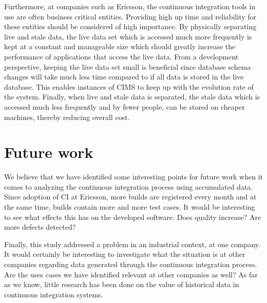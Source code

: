 Furthermore, at companies such as Ericsson, the continuous integration tools in use are often business critical entities. Providing high up time and reliability for these entities should be considered of high importance. By physically separating live and stale data, the live data set which is accessed much more frequently is kept at a constant and manageable size which should greatly increase the performance of applications that access the live data. From a development perspective, keeping the live data set small is beneficial since database schema changes will take much less time compared to if all data is stored in the live database. This enables instances of CIMS to keep up with the evolution rate of the system. Finally, when live and stale data is separated, the stale data which is accessed much less frequently and by fewer people, can be stored on cheaper machines, thereby reducing overall cost.


\section{Future work}
We believe that we have identified some interesting points for future work when it comes to analyzing the continuous integration process using accumulated data. Since adoption of CI at Ericsson, more builds are registered every month and at the same time, builds contain more and more test cases. It would be interesting to see what effects this has on the developed software. Does quality increase? Are more defects detected? 

Finally, this study addressed a problem in an industrial context, at one company. It would certainly be interesting to investigate what the situation is at other companies regarding data generated through the continuous integration process. Are the uses cases we have identified relevant at other companies as well? As far as we know, little research has been done on the value of historical data in continuous integration systems.

